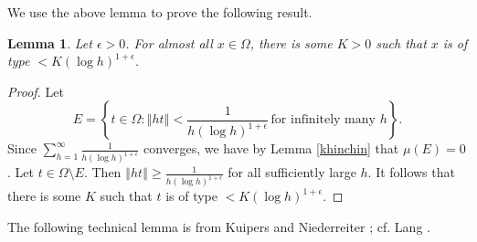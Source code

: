 \documentclass{amsart}
\newcommand{\norm}[1]{\left\Vert #1 \right\Vert}
\newtheorem{lemma}[theorem]{Lemma}
\begin{document}
We use the above lemma to prove the following result.

\begin{lemma}
Let $\epsilon>0$. For almost all $x \in \Omega$, there is some $K>0$ such that $x$ is of type $<K(\log h)^{1+\epsilon}$.
\label{aatype}
\end{lemma}
\begin{proof}
Let
\[
E =\left\{t \in \Omega: \norm{ht} < \frac{1}{h(\log h)^{1+\epsilon}} \, \textrm{for infinitely many $h$}\right\}.
\]
Since $\sum_{h=1}^\infty \frac{1}{h(\log h)^{1+\epsilon}}$ converges, we have by Lemma \ref{khinchin} that
$\mu(E)=0$. 
Let $t \in \Omega \setminus E$.  Then $\norm{ht} \geq \frac{1}{h (\log h)^{1+\epsilon}}$ for all sufficiently large $h$.
It follows that there is some $K$ such that $t$ is of type $<K(\log h)^{1+\epsilon}$.
\end{proof}



The following technical lemma is from Kuipers and Niederreiter \cite[p.~130, Exercise 3.9]{kuipers}; cf. Lang \cite[p.~39, Lemma]{MR0209227}.
\end{document}
